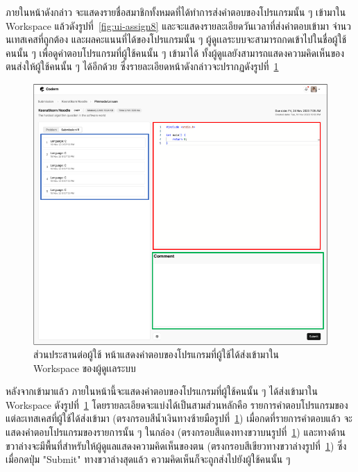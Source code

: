 \documentclass[12pt,one side,openright,a4paper]{cpe-thesis-th}
\newcommand{\thaijustify}[1]{%
  \par\hspace{30pt}\justifying
  #1
}
\begin{document}
    \thaijustify{
        ภายในหน้าดังกล่าว จะแสดงรายชื่อสมาชิกทั้งหมดที่ได้ทำการส่งคำตอบของโปรแกรมนั้น ๆ เข้ามาใน Workspace แล้วดังรูปที่~\ref{fig:ui-assign8} และจะแสดงรายละเอียดวันเวลาที่ส่งคำตอบเข้ามา จำนวนเทสเคสที่ถูกต้อง และผลคะแนนที่ได้ของโปรแกรมนั้น ๆ ผู้ดูเเลระบบจะสามารถกดเข้าไปในชื่อผู้ใช้คนนั้น ๆ เพื่อดูคำตอบโปรแกรมที่ผู้ใช้คนนั้น ๆ เข้ามาได้ ทั้งผู้ดูแลยังสามารถแสดงความคิดเห็นของตนส่งให้ผู้ใช้คนนั้น ๆ ได้อีกด้วย ซึ่งรายละเอียดหน้าดังกล่าวจะปรากฏดังรูปที่~\ref{fig:ui-code3}
    }
    \hypertarget{ui-code3}{
        \begin{figure}[H]
        \centering
            \includegraphics[width=15cm]{figure/ui/ui-code3.png}
            \caption[ส่วนประสานต่อผู้ใช้ หน้าแสดงคำตอบของโปรแกรมที่ผู้ใช้ได้ส่งเข้ามาใน Workspace ของผู้ดูเเลระบบ]{ส่วนประสานต่อผู้ใช้ หน้าแสดงคำตอบของโปรแกรมที่ผู้ใช้ได้ส่งเข้ามาใน Workspace ของผู้ดูเเลระบบ}
            \label{fig:ui-code3}
        \end{figure}
    }
    \thaijustify{
        หลังจากเข้ามาแล้ว ภายในหน้านี้จะแสดงคำตอบของโปรแกรมที่ผู้ใช้คนนั้น ๆ ได้ส่งเข้ามาใน Workspace ดังรูปที่~\ref{fig:ui-code3} โดยรายละเอียดจะแบ่งได้เป็นสามส่วนหลักคือ รายการคำตอบโปรแกรมของแต่ละเทสเคสที่ผู้ใช้ได้ส่งเข้ามา (ตรงกรอบสีน้ำเงินทางซ้ายมือรูปที่~\ref{fig:ui-code3}) เมื่อกดที่รายการคำตอบแล้ว จะแสดงคำตอบโปรแกรมของรายการนั้น ๆ ในกล่อง (ตรงกรอบสีแดงทางขวาบนรูปที่~\ref{fig:ui-code3}) และทางด้านขวาล่างจะมีพื้นที่สำหรับให้ผู้ดูแลแสดงความคิดเห็นของตน (ตรงกรอบสีเขียวทางขวาล่างรูปที่~\ref{fig:ui-code3}) ซึ่งเมื่อกดปุ่ม "Submit" ทางขวาล่างสุดแล้ว ความคิดเห็นก็จะถูกส่งไปยังผู้ใช้คนนั้น ๆ
    }
\end{document}
